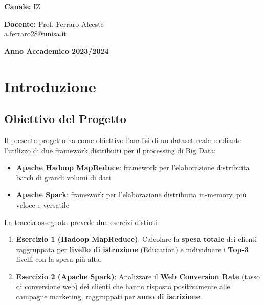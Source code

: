 \documentclass[a4paper, 12pt, oneside]{report}
\begin{document}
\begin{titlepage}
\begin{center}
        \vspace{0.8cm}

        \textbf{Canale:} IZ

        \vspace{0.8cm}

        \textbf{Docente:} Prof. Ferraro Alceste\\[1mm]
        a.ferraro28@unisa.it
        
        \vfill
        
        {\large\textbf{Anno Accademico 2023/2024}}
        
    \end{center}
\end{titlepage}

\thispagestyle{empty}
\tableofcontents
\newpage

\chapter{Introduzione}

\section{Obiettivo del Progetto}

Il presente progetto ha come obiettivo l'analisi di un dataset reale mediante l'utilizzo di due framework distribuiti per il processing di Big Data:

\begin{itemize}
    \item \textbf{Apache Hadoop MapReduce}: framework per l'elaborazione distribuita batch di grandi volumi di dati
    \item \textbf{Apache Spark}: framework per l'elaborazione distribuita in-memory, pi\`u veloce e versatile
\end{itemize}

La traccia assegnata prevede due esercizi distinti:

\begin{enumerate}
    \item \textbf{Esercizio 1 (Hadoop MapReduce)}: Calcolare la \textbf{spesa totale} dei clienti raggruppata per \textbf{livello di istruzione} (Education) e individuare i \textbf{Top-3} livelli con la spesa pi\`u alta.
    
    \item \textbf{Esercizio 2 (Apache Spark)}: Analizzare il \textbf{Web Conversion Rate} (tasso di conversione web) dei clienti che hanno risposto positivamente alle campagne marketing, raggruppati per \textbf{anno di iscrizione}.
\end{enumerate}
\end{document}
